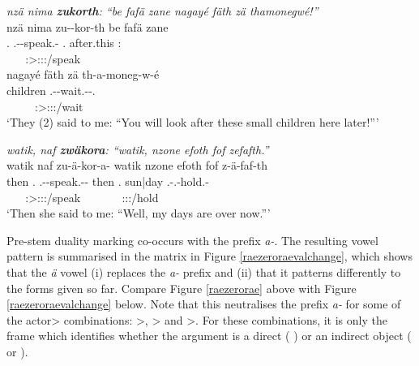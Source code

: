 \begin{exe}
	\ex \emph{nzä nima \textbf{zukorth}: ``be fafä zane nagayé fäth zä thamonegwé!''}\\
	\glll nzä nima zu-\Zero-kor-th be fafä zane\\
	\Fsg.\Abs{} \Quot{} \Fsg.\Gam-\Du-speak.\Rs-\Stnsg{} \Ssg.\Erg{} after.this \Dem:\Prox{}\\
	~ ~ {\Stdu:\Sbj>\Fsg:\Obj:\Rpst:\Pfv/speak} ~ ~ ~\\
	\sn
	\glll nagayé fäth zä th-a-moneg-w-é\\
	children \Dim{} \Prox{} \Stnsg.\Bet-\Vc-wait.\Ext-\Ndu-\Ssg.\Imp{}\\
	~ ~ ~ {\Ssg:\Sbj>\Stpl:\Io:\Imp:\Ipfv/wait}\\
	\trans `They (2) said to me: ``You will look after these small children here later!'''\\ 
	\label{ex258}
\end{exe}
\begin{exe}
	\ex \emph{watik, naf \textbf{zwäkora}: ``watik, nzone efoth fof {\fixgll} zefafth.''}\\
	\glll watik naf zu-ä-kor-a-\Zero{} watik nzone efoth fof{\fixgll} z-ä-faf-th\\
	then \Tsg.\Erg{} \Fsg.\Gam-\Ndu-speak.\Rs-\Pst-\Stsg{} then \Fsg.\Poss{} sun|day \Emph{} \M.\Gam-\Ndu.\Vc-hold.\Rs-\Stnsg{}\\
	~ ~ {\Stsg:\Sbj>\Fsg:\Obj:\Pst:\Pfv/speak} ~ ~ ~ ~ {\Stnsg:\Sbj:\Pst:\Pfv/hold}\\
	\trans `Then she said to me: ``Well, my days are over now.''' 
	\label{ex257}
\end{exe}

Pre-stem duality marking co-occurs with the  prefix \emph{a-}. The resulting vowel pattern is summarised in the matrix in Figure \ref{raezeroraevalchange}, which shows that the  \emph{ä} vowel (i) replaces the \emph{a-} prefix and (ii) that it patterns differently to the forms given so far. Compare Figure \ref{raezerorae} above with Figure \ref{raezeroraevalchange} below. Note that this neutralises the  prefix \emph{a-} for some of the actor> combinations: \Pl>\Sg{}, \Sg>\Pl{} and \Pl>\Pl{}. For these combinations, it is only the  frame which identifies whether the  argument is a direct  (\Abs{} ) or an indirect object (\Dat{} or \Poss{} ).

